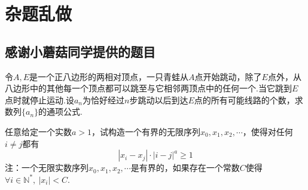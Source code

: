\documentclass[cn,hazy,black,10pt,normal]{elegantnote}
\begin{document}
\part{杂题乱做}

\chapter{感谢小蘑菇同学提供的题目}

\begin{problem}
	令$A,E$是一个正八边形的两相对顶点，一只青蛙从$A$点开始跳动，除了$E$点外，从八边形中的其他每一个顶点都可以跳至与它相邻两顶点中的任何一个.当它跳到$E$点时就停止运动.设$a_n$为恰好经过$n$步跳动以后到达$E$点的所有可能线路的个数，求数列$\{ a_n \}$的通项公式.
\end{problem}

\begin{problem}
	任意给定一个实数$a>1$，试构造一个有界的无限序列$x_0,x_1,x_2, \cdots $，使得对任何$i \neq j$都有$$|x_i - x_j| \cdot |i-j|^a \geq 1$$
	注：一个无限实数序列$x_0,x_1,x_2, \cdots $是有界的，如果存在一个常数$C$使得$\forall i \in \mathbb{N}^{*} ,~ |x_i|<C$.
\end{problem}
\end{document}
